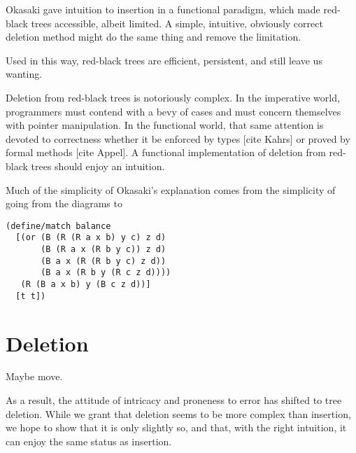 \documentclass[preprint]{sigplanconf}
\begin{document}
Okasaki gave intuition to insertion in a functional paradigm, which made red-black trees accessible, albeit limited. A simple, intuitive, obviously correct deletion method might do the same thing and remove the limitation.



Used in this way, red-black trees are efficient, persistent, and still leave us wanting.

Deletion from red-black trees is notoriously complex. In the imperative world, programmers must contend with a bevy of cases and must concern themselves with pointer manipulation. In the functional world, that same attention is devoted to correctness whether it be enforced by types [cite Kahrs] or proved by formal methods [cite Appel]. A functional implementation of deletion from red-black trees should enjoy an intuition.







Much of the simplicity of Okasaki's explanation comes from the simplicity of going from the diagrams to
\begin{verbatim}
(define/match balance
  [(or (B (R (R a x b) y c) z d)
       (B (R a x (R b y c)) z d)
       (B a x (R (R b y c) z d))
       (B a x (R b y (R c z d))))
   (R (B a x b) y (B c z d))]
  [t t])
\end{verbatim}






\section{Deletion}

Maybe move.

 As a result, the attitude of intricacy and proneness to error has shifted to tree deletion. While we grant that deletion seems to be more complex than insertion, we hope to show that it is only slightly so, and that, with the right intuition, it can enjoy the same status as insertion.
\end{document}

